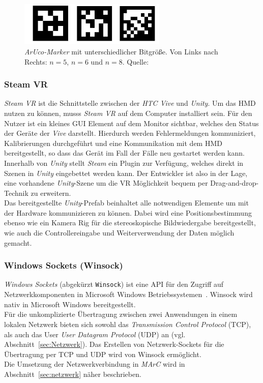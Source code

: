 \begin{figure}[H] 
	\center 
	\includegraphics[width=7cm]{Bilder/VerschAruco.jpg}			
	\caption[\textit{ArUco-Marker} mit unterschiedlicher Bitgröße]{\textit{ArUco-Marker} mit unterschiedlicher Bitgröße. Von Links nach Rechts: $n=5$, $n=6$ und $n=8$. Quelle: \cite{article:Aruco2014}}
	\label{fig:SizesArucoMarker}
\end{figure}


\subsubsection{Steam VR}
\textit{Steam VR} \cite{website:steamVR} ist die Schnittstelle zwischen der \textit{HTC Vive} und \textit{Unity}. Um das HMD nutzen zu können, musss \textit{Steam VR} auf dem Computer installiert sein. Für den Nutzer ist ein kleines GUI Element auf dem Monitor sichtbar, welches den Status der Geräte der \textit{Vive} darstellt. Hierdurch werden Fehlermeldungen kommuniziert, Kalibrierungen durchgeführt und eine Kommunikation mit dem HMD bereitgestellt, so dass das Gerät im Fall der Fälle neu gestartet werden kann.\\
Innerhalb von \textit{Unity} stellt \textit{Steam} ein Plugin zur Verfügung, welches direkt in Szenen in \textit{Unity} eingebettet werden kann. Der Entwickler ist also in der Lage, eine vorhandene \textit{Unity}-Szene um die VR Möglichkeit bequem per Drag-and-drop-Technik zu erweitern.\\
Das bereitgestellte \textit{Unity}-Prefab beinhaltet alle notwendigen Elemente um mit der Hardware kommunizieren zu können. Dabei wird eine Positionsbestimmung ebenso wie ein Kamera Rig für die stereoskopische Bildwiedergabe bereitgestellt, wie auch die Controllereingabe und Weiterverwendung der Daten möglich gemacht.



\subsubsection{Windows Sockets (Winsock)}\label{sec:Winsock}%
\textit{Windows Sockets} (abgekürzt \texttt{Winsock}) ist eine API für den Zugriff auf Netzwerkkomponenten in Microsoft Windows Betriebssystemen~\cite{quinn1998windows}. Winsock wird nativ in Microsoft Windows bereitgestellt.\\ 
Für die unkomplizierte Übertragung zwischen zwei Anwendungen in einem lokalen Netzwerk bieten sich sowohl das \emph{Transmission Control Protocol} (TCP), als auch das User \emph{User Datagram Protocol} (UDP) an (vgl. Abschnitt~\ref{sec:Netzwerk}). Das Erstellen von Netzwerk-Sockets für die Übertragung per TCP und UDP wird von Winsock ermöglicht.\\ Die Umsetzung der Netzwerkverbindung in \emph{MArC} wird in Abschnitt~\ref{sec:netzwerk} näher beschrieben.

